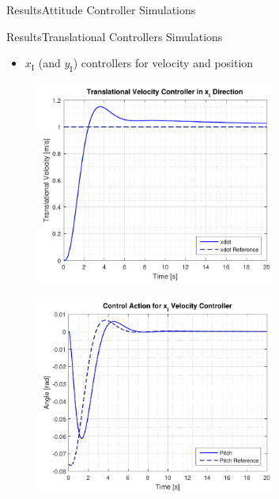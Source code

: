 \begin{frame}{Results}{Attitude Controller Simulations}
\begin{minipage}{\linewidth}
\begin{minipage}{0.49\linewidth}
\begin{figure}[H]
              \end{figure}              
          \end{minipage}
      \end{minipage}  
\end{frame}

\begin{frame}{Results}{Translational Controllers Simulations}
    \begin{itemize}
        \item $x_\mathrm{I}$ (and $y_\mathrm{I}$) controllers for velocity and position
    \end{itemize}
    
    \begin{minipage}{\linewidth}
        \begin{minipage}{0.49\linewidth}
             \begin{figure}[H]
                 \centering
                 \includegraphics[width=0.7\textwidth]{figures/xdotStep}  
               \end{figure} 
          \end{minipage}
          \hspace{0.03\linewidth}
          \begin{minipage}{0.49\linewidth}
             \begin{figure}[H]
                 \centering
                 \includegraphics[width=0.7\textwidth]{figures/xdotStepAction}  

\end{figure}
\end{minipage}
\end{minipage}
\end{frame}
